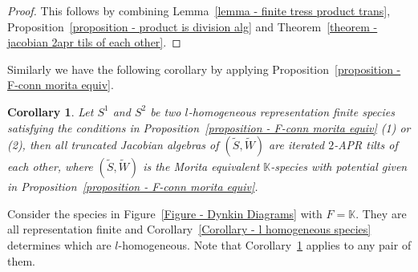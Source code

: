 \documentclass[a4paper, reqno]{amsart}
\newtheorem{mycor}[mythm]{Corollary}
\theoremstyle{definition}
\newcommand{\K}{\mathbb{K}}
\begin{document}
\begin{proof}
	This follows by combining Lemma~\ref{lemma - finite tress product trans}, Proposition~\ref{proposition - product is division alg} and Theorem~\ref{theorem - jacobian 2apr tils of each other}.
\end{proof}

Similarly we have the following corollary by applying Proposition~\ref{proposition - F-conn morita equiv}.

\begin{mycor}\label{corollary - tensor product species morita transitive}
	Let $S^1$ and $S^2$ be two $l$-homogeneous representation finite species satisfying the conditions in Proposition~\ref{proposition - F-conn morita equiv} (1) or (2), then all truncated Jacobian algebras of $(\tilde{S}, \tilde{W})$ are iterated $2$-APR tilts of each other, where $(\tilde{S}, \tilde{W})$ is the Morita equivalent $\K$-species with potential given in Proposition~\ref{proposition - F-conn morita equiv}.
\end{mycor}

Consider the species in Figure~\ref{Figure - Dynkin Diagrams} with $F = \K$. They are all representation finite and Corollary~\ref{Corollary - l homogeneous species} determines which are $l$-homogeneous. Note that Corollary~\ref{corollary - tensor product species morita transitive} applies to any pair of them.
\end{document}
